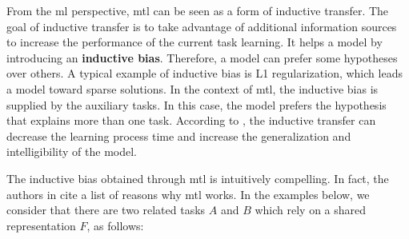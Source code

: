 From the \acl{ml} perspective, \acl{mtl} can be seen as a form of inductive transfer. The goal of inductive transfer is to take advantage of additional information sources to increase the performance of the current task learning. It helps a model by introducing an \textbf{inductive bias}. Therefore, a model can prefer some hypotheses over others. A typical example of inductive bias is L1 regularization, which leads a model toward sparse solutions. In the context of \acs{mtl}, the inductive bias is supplied by the auxiliary tasks. In this case, the model prefers the hypothesis that explains more than one task. According to \cite{Caruana1997}, the inductive transfer can decrease the learning process time and increase the generalization and intelligibility of the model. 

The inductive bias obtained through \acs{mtl} is intuitively compelling. In fact, the authors in \citep{ruder2017overview} cite a list of reasons why \acs{mtl} works. In the examples below, we consider that there are two related tasks $A$ and $B$ which rely on a shared representation $F$, as follows:


